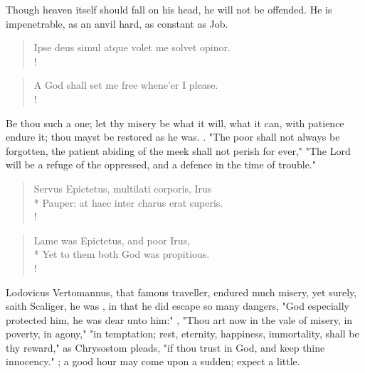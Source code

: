 {Though heaven itself should fall on his head, he will not be offended. He is impenetrable, as an anvil hard, as constant as Job.

\begin{latin}
\begin{verse}%
Ipse deus simul atque volet me solvet opinor.\\!
\end{verse}%
\end{latin}



\begin{verse}%
A God shall set me free whene'er I please.\\!
\end{verse}%

Be thou such a one; let thy misery be what it will, what it can, with patience endure it; thou mayst be restored as he was. . "The poor shall not always be forgotten, the patient abiding of the meek shall not perish for ever,"   "The Lord will be a refuge of the oppressed, and a defence in the time of trouble."

\begin{latin}
\begin{verse}%
Servus Epictetus, multilati corporis, Irus\\*
Pauper: at haec inter charus erat superis.\\!
\end{verse}%
\end{latin}



\begin{verse}%
Lame was Epictetus, and poor Irus,\\*
Yet to them both God was propitious.\\!
\end{verse}%

Lodovicus Vertomannus, that famous traveller, endured much misery, yet surely, saith Scaliger, he was , in that he did escape so many dangers, "God especially protected him, he was dear unto him:" , \etc{} "Thou art now in the vale of misery, in poverty, in agony," "in temptation; rest, eternity, happiness, immortality, shall be thy reward," as Chrysostom pleads, "if thou trust in God, and keep thine innocency." ; a good hour may come upon a sudden; expect a little.

}
